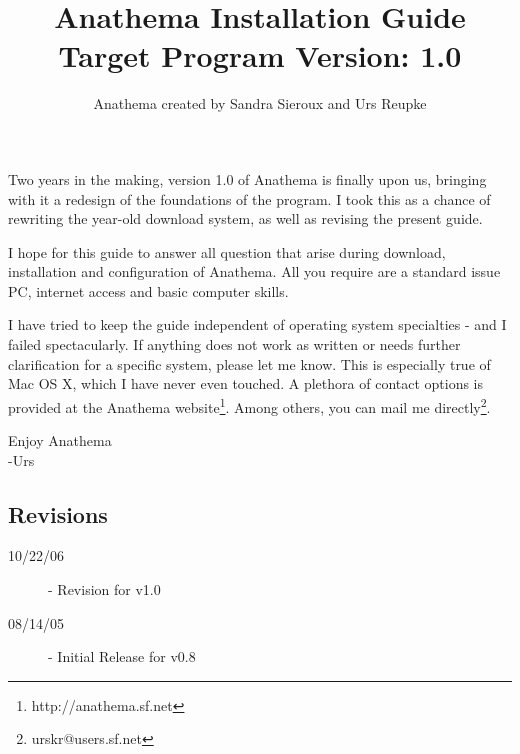 \documentclass[]{article}
\title{Anathema Installation Guide\\ Target Program Version: 1.0}
\author{Anathema created by Sandra Sieroux and Urs Reupke}
\date{}
\begin{document}
\sffamily
\maketitle
\tableofcontents
\bigskip
Two years in the making, version 1.0 of Anathema is finally upon us, bringing with it a redesign of the foundations of the program. I took this as a chance of rewriting the year-old download system, as well as revising the present guide. 

I hope for this guide to answer all question that arise during download, installation and configuration of Anathema. All you require are a standard issue PC, internet access and basic computer skills.

I have tried to keep the guide independent of operating system specialties - and I failed spectacularly. If anything does not work as written or needs further clarification for a specific system, please let me know. This is especially true of Mac OS X, which I have never even touched. A plethora of contact options is provided at the Anathema website\footnote{http://anathema.sf.net}. Among others, you can mail me directly\footnote{urskr@users.sf.net}.
\begin{flushright}
Enjoy Anathema\\
	-Urs
\end{flushright}

\begin{appendix}
\section*{Revisions}
\begin{description}
\item[10/22/06] - Revision for v1.0
\item[08/14/05] - Initial Release for v0.8
\end{description}
\end{appendix}
\end{document}
